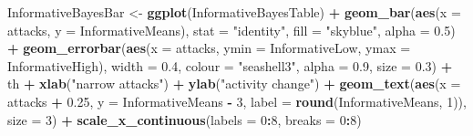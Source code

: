\documentclass[10pt,]{scrartcl}
\newenvironment{Shaded}{\begin{snugshade}}{\end{snugshade}}
\newcommand{\KeywordTok}[1]{\textcolor[rgb]{0.13,0.29,0.53}{\textbf{#1}}}
\newcommand{\DataTypeTok}[1]{\textcolor[rgb]{0.13,0.29,0.53}{#1}}
\newcommand{\DecValTok}[1]{\textcolor[rgb]{0.00,0.00,0.81}{#1}}
\newcommand{\FloatTok}[1]{\textcolor[rgb]{0.00,0.00,0.81}{#1}}
\newcommand{\StringTok}[1]{\textcolor[rgb]{0.31,0.60,0.02}{#1}}
\newcommand{\OperatorTok}[1]{\textcolor[rgb]{0.81,0.36,0.00}{\textbf{#1}}}
\newcommand{\NormalTok}[1]{#1}
\begin{document}
\begin{Shaded}
\begin{Highlighting}[]
\NormalTok{InformativeBayesBar <-}\StringTok{ }\KeywordTok{ggplot}\NormalTok{(InformativeBayesTable) }\OperatorTok{+}\StringTok{ }\KeywordTok{geom_bar}\NormalTok{(}\KeywordTok{aes}\NormalTok{(}\DataTypeTok{x =}\NormalTok{ attacks,}
    \DataTypeTok{y =}\NormalTok{ InformativeMeans), }\DataTypeTok{stat =} \StringTok{"identity"}\NormalTok{, }\DataTypeTok{fill =} \StringTok{"skyblue"}\NormalTok{,}
    \DataTypeTok{alpha =} \FloatTok{0.5}\NormalTok{) }\OperatorTok{+}\StringTok{ }\KeywordTok{geom_errorbar}\NormalTok{(}\KeywordTok{aes}\NormalTok{(}\DataTypeTok{x =}\NormalTok{ attacks, }\DataTypeTok{ymin =}\NormalTok{ InformativeLow,}
    \DataTypeTok{ymax =}\NormalTok{ InformativeHigh), }\DataTypeTok{width =} \FloatTok{0.4}\NormalTok{, }\DataTypeTok{colour =} \StringTok{"seashell3"}\NormalTok{,}
    \DataTypeTok{alpha =} \FloatTok{0.9}\NormalTok{, }\DataTypeTok{size =} \FloatTok{0.3}\NormalTok{) }\OperatorTok{+}\StringTok{ }\NormalTok{th }\OperatorTok{+}\StringTok{ }\KeywordTok{xlab}\NormalTok{(}\StringTok{"narrow attacks"}\NormalTok{) }\OperatorTok{+}
\StringTok{    }\KeywordTok{ylab}\NormalTok{(}\StringTok{"activity change"}\NormalTok{) }\OperatorTok{+}\StringTok{ }\KeywordTok{geom_text}\NormalTok{(}\KeywordTok{aes}\NormalTok{(}\DataTypeTok{x =}\NormalTok{ attacks }\OperatorTok{+}\StringTok{ }\FloatTok{0.25}\NormalTok{,}
    \DataTypeTok{y =}\NormalTok{ InformativeMeans }\OperatorTok{-}\StringTok{ }\DecValTok{3}\NormalTok{, }\DataTypeTok{label =} \KeywordTok{round}\NormalTok{(InformativeMeans,}
        \DecValTok{1}\NormalTok{)), }\DataTypeTok{size =} \DecValTok{3}\NormalTok{) }\OperatorTok{+}\StringTok{ }\KeywordTok{scale_x_continuous}\NormalTok{(}\DataTypeTok{labels =} \DecValTok{0}\OperatorTok{:}\DecValTok{8}\NormalTok{, }\DataTypeTok{breaks =} \DecValTok{0}\OperatorTok{:}\DecValTok{8}\NormalTok{)}
\end{Highlighting}
\end{Shaded}

\newpage
\end{document}
